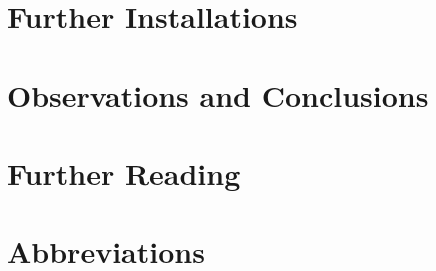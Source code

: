 \documentclass[english]{report}
\begin{document}


\chapter{Further Installations}



\chapter{Observations and Conclusions}



\chapter{Further Reading}



\appendix

%


\chapter{Abbreviations}

\printacronyms[include-classes=abbrev,name=]

\newpage


%




\end{document}
